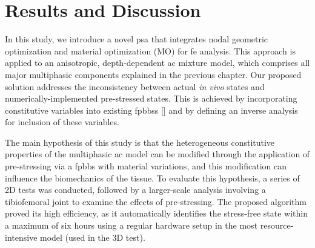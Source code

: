 \documentclass[12pt,a4paper]{report}
\begin{document}
\section{Results and Discussion}

In this study, we introduce a novel \ac{psa} that integrates nodal geometric optimization and material optimization (MO) for \ac{fe} analysis. This approach is applied to an anisotropic, depth-dependent \ac{ac} mixture model, which comprises all major multiphasic components explained in the previous chapter. Our proposed solution addresses the inconsistency between actual \textit{in vivo} states and numerically-implemented pre-stressed states. This is achieved by incorporating constitutive variables into existing \acp{fpbbs} [\cite{wang2018,bols2013,pandolfi2008}] and by defining an inverse analysis for inclusion of these variables.

The main hypothesis of this study is that the heterogeneous constitutive properties of the multiphasic \ac{ac} model can be modified through the application of  pre-stressing via a \ac{fpbbs} with material variations, and this modification can influence the biomechanics of the tissue. To evaluate this hypothesis, a series of 2D tests was conducted, followed by a larger-scale analysis involving a tibiofemoral joint to examine the effects of pre-stressing. The proposed algorithm proved its high efficiency, as it automatically identifies the stress-free state within a maximum of six hours using a regular hardware setup in the most resource-intensive model (used in the 3D test).
\end{document}

